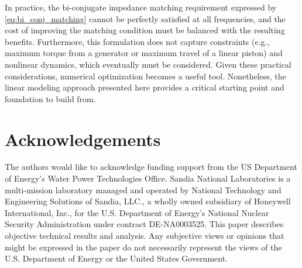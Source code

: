 \documentclass[twocolumn]{autart}
\begin{document}
In practice, the bi-conjugate impedance matching requirement expressed by \eqref{eq:bi_conj_matching} cannot be perfectly satisfied at all frequencies, and the cost of improving the matching condition must be balanced with the resulting benefits.
Furthermore, this formulation does not capture constraints (e.g., maximum torque from a generator or maximum travel of a linear piston) and nonlinear dynamics, which eventually must be considered.
Given these practical considerations, numerical optimization becomes a useful tool.
Nonetheless, the linear modeling approach presented here provides a critical starting point and foundation to build from.

\section{Acknowledgements}
The authors would like to acknowledge funding support from the US Department of Energy's Water Power Technologies Office.
Sandia National Laboratories is a multi-mission laboratory managed and operated by National Technology and Engineering Solutions of Sandia, LLC., a wholly owned subsidiary of Honeywell International, Inc., for the U.S. Department of Energy's National Nuclear Security Administration under contract DE-NA0003525.
This paper describes objective technical results and analysis.
Any subjective views or opinions that might be expressed in the paper do not necessarily represent the views of the U.S. Department of Energy or the United States Government.



\end{document}
